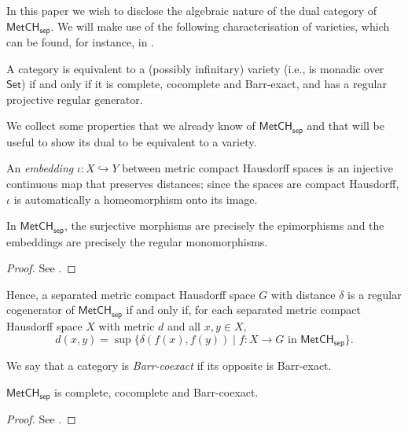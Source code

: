 \documentclass[11pt]{amsart}
\theoremstyle{definition}
\newcommand{\cat}[1]{\mathsf{#1}}
\newcommand{\MetCHsep}{\cat{MetCH_{sep}}}
\newcommand{\Set}{\cat{Set}}
\begin{document}
In this paper we wish to disclose the algebraic nature of the dual category of \(\MetCHsep\).
We will make use of the following characterisation of varieties, which can be found, for instance, in \cite[Thm.~4.4.5]{Bor94a}.

\begin{theorem}
  \label{d:thm:1}
  A category is equivalent to a (possibly infinitary) variety (i.e., is monadic over $\Set$) if and only if it is complete, cocomplete and Barr-exact, and has a regular projective regular generator.
\end{theorem}


We collect some properties that we already know of $\MetCHsep$ and that will be useful to show its dual to be equivalent to a variety.

An \emph{embedding} $\iota \colon X \hookrightarrow Y$ between metric compact Hausdorff spaces is an injective continuous map that preserves distances; since the spaces are compact Hausdorff, $\iota$ is automatically a homeomorphism onto its image.

\begin{theorem}
  \label{p:regmono=embeddings}
  In $\MetCHsep$, the surjective morphisms are precisely the epimorphisms and the embeddings are precisely the regular monomorphisms.
\end{theorem}
\begin{proof}
  See \cite[Props.~4.5 and~4.6]{AH25}.
\end{proof}

\begin{remark}
  \label{r:reg-cogen-criterion}
  Hence, a separated metric compact Hausdorff space \(G\) with distance \(\delta\) is a regular cogenerator of \(\MetCHsep\) if and only if, for each separated metric compact Hausdorff space \(X\) with metric \(d\) and all \(x,y\in X\),
  \begin{displaymath}
    d(x,y)=\sup\{\delta(f(x),f(y))\mid f \colon X\to G\text{ in }\MetCHsep\}.
  \end{displaymath}
\end{remark}

We say that a category is \emph{Barr-coexact} if its opposite is Barr-exact.

\begin{theorem}
  $\MetCHsep$ is complete, cocomplete and Barr-coexact.
\end{theorem}
\begin{proof}
  See \cite[Thms.~2.5 and~5.16]{AH25}.
\end{proof}
\end{document}
